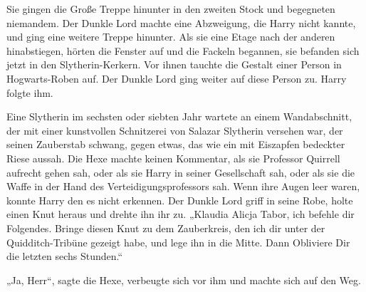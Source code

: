 Sie gingen die Große Treppe hinunter in den zweiten Stock und begegneten niemandem.
Der Dunkle Lord machte eine Abzweigung, die Harry nicht kannte, und ging eine weitere Treppe hinunter. Als sie eine Etage nach der anderen hinabstiegen, hörten die Fenster auf und die Fackeln begannen, sie befanden sich jetzt in den Slytherin-Kerkern.
Vor ihnen tauchte die Gestalt einer Person in Hogwarts-Roben auf.
Der Dunkle Lord ging weiter auf diese Person zu.
Harry folgte ihm.

Eine Slytherin im sechsten oder siebten Jahr wartete an einem Wandabschnitt, der mit einer kunstvollen Schnitzerei von Salazar Slytherin versehen war, der seinen Zauberstab schwang, gegen etwas, das wie ein mit Eiszapfen bedeckter Riese aussah. Die Hexe machte keinen Kommentar, als sie Professor Quirrell aufrecht gehen sah, oder als sie Harry in seiner Gesellschaft sah, oder als sie die Waffe in der Hand des Verteidigungsprofessors sah. Wenn ihre Augen leer waren, konnte Harry den es nicht erkennen.
Der Dunkle Lord griff in seine Robe, holte einen Knut heraus und drehte ihn ihr zu.
„Klaudia Alicja Tabor, ich befehle dir Folgendes. Bringe diesen Knut zu dem Zauberkreis, den ich dir unter der Quidditch-Tribüne gezeigt habe, und lege ihn in die Mitte. Dann Obliviere Dir die letzten sechs Stunden.“

„Ja, Herr“, sagte die Hexe, verbeugte sich vor ihm und machte sich auf den Weg.

